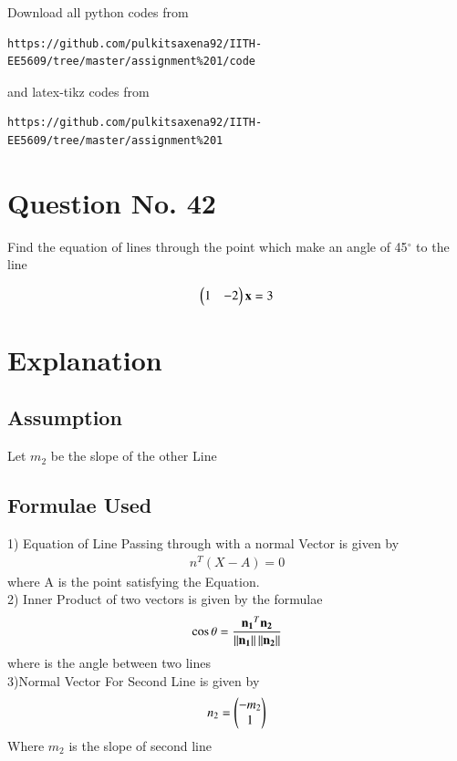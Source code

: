 \documentclass[journal,12pt,twocolumn]{IEEEtran}
\begin{document}
%
Download all python codes from 
\begin{lstlisting}
https://github.com/pulkitsaxena92/IITH-EE5609/tree/master/assignment%201/code
\end{lstlisting}
%
and latex-tikz codes from 
%
\begin{lstlisting}
https://github.com/pulkitsaxena92/IITH-EE5609/tree/master/assignment%201
\end{lstlisting}
\section{Question No. 42}
Find the equation of lines through the point   which make an angle of 45$^{\circ}$ to the line

\begin{align}
\begin{pmatrix}1 & -2\end{pmatrix}\mathbf{x} = 3 
\end{align}
\section{Explanation}
\subsection{Assumption}
Let $m_2$ be the slope of the other Line
\subsection{Formulae Used}
1) Equation of Line Passing through  with a normal Vector is given by
\begin{align}
    n^T(X-A)=0 
\end{align}
where A is the point satisfying the Equation.
\\2) Inner Product of two vectors is given by the formulae
\begin{align}
 \cos \theta &= \frac{\mathbf{n_1}^T\mathbf{n_2}}{\left\lVert\mathbf{n_1}\right\rVert\left\lVert\mathbf{n_2}\right\rVert}\\   
\end{align}
where is the angle between two lines
\\3)Normal Vector For Second Line is given by
\begin{align}
n_2=\begin{pmatrix}-m_2\\1\end{pmatrix}
\end{align}
Where $m_2$ is the slope of second line
\end{document}
